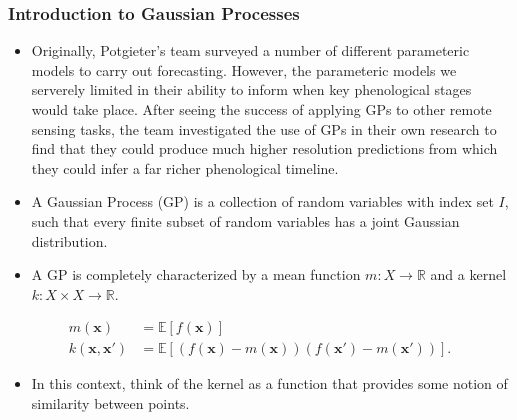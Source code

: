 \documentclass[9pt,hyperref={pdfpagelabels=false},xcolor=table]{beamer}
\begin{document}
\begin{frame}
    \frametitle{Introduction to Gaussian Processes}
    \begin{itemize}
        \item Originally, Potgieter's team surveyed a number of different parameteric models to carry out forecasting. However, the parameteric models we serverely limited in their ability to inform when key phenological stages would take place. After seeing the success of applying GPs to other remote sensing tasks, the team investigated the use of GPs in their own research to find that they could produce much higher resolution predictions from which they could infer a far richer phenological timeline.
        \item A Gaussian Process (GP) is a collection of random variables with index set $I$, such that every finite subset of random variables has a joint Gaussian distribution.
        \item A GP is completely characterized by a mean function $m : X \to \mathbb{R}$ and a kernel $k : X \times X \to \mathbb{R}$.
    \end{itemize}
    \begin{align*}
        m(\bm{x})           & = \mathbb{E} \left[ f(\bm{x}) \right]                                          \\
        k (\bm{x}, \bm{x'}) & = \mathbb{E} \left[ (f(\bm{x}) - m(\bm{x})) (f(\bm{x'}) - m(\bm{x'})) \right].
    \end{align*}
    \begin{itemize}
        \item In this context, think of the kernel as a function that provides some notion of similarity between points.
    \end{itemize}
\end{frame}
\end{document}
